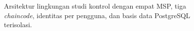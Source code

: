 \begin{figure}[H]
\centering
\resizebox{\textwidth}{!}{%

}
\caption{Arsitektur lingkungan studi kontrol dengan empat MSP, tiga \textit{chaincode}, identitas per pengguna, dan basis data PostgreSQL terisolasi.}
\label{fig:ch3-study-controls}
\end{figure}
